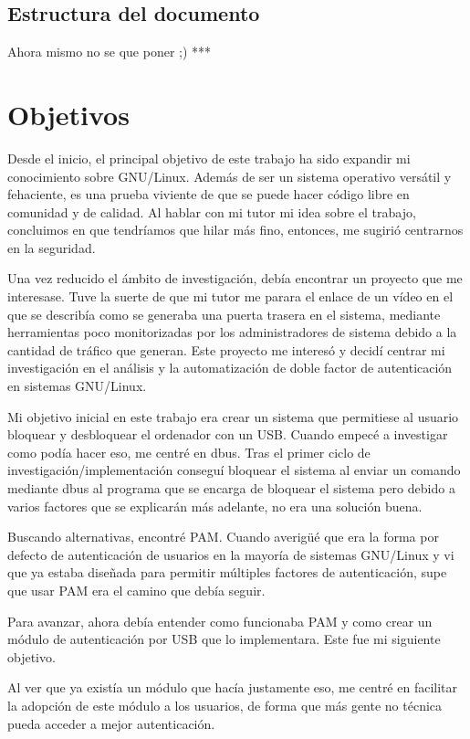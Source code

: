 \documentclass[titlepage, 12pt, a4paper]{article}
\begin{document}
\subsection{Estructura del documento}
Ahora mismo no se que poner ;) ***
\section{Objetivos}
Desde el inicio, el principal objetivo de este trabajo ha sido expandir mi conocimiento sobre \Gls{GNU/Linux}. Además de ser un sistema operativo versátil y fehaciente, es una prueba viviente de que se puede hacer código libre en comunidad y de calidad. Al hablar con mi tutor mi idea sobre el trabajo, concluimos en que tendríamos que hilar más fino, entonces, me sugirió centrarnos en la seguridad. \par
Una vez reducido el ámbito de investigación, debía encontrar un proyecto que me interesase. Tuve la suerte de que mi tutor me parara el enlace de un vídeo en el que se describía como se generaba una puerta trasera en el sistema, mediante herramientas poco monitorizadas por los administradores de sistema debido a la cantidad de tráfico que generan. Este proyecto me interesó y decidí centrar mi investigación en el análisis y la automatización de doble factor de autenticación en sistemas \Gls{GNU/Linux}. \par 
Mi objetivo inicial en este trabajo era crear un sistema que permitiese al usuario bloquear y desbloquear el ordenador con un \Gls{USB}. Cuando empecé a investigar como podía hacer eso, me centré en \Gls{dbus}. Tras el primer ciclo de investigación/implementación conseguí bloquear el sistema al enviar un comando mediante \Gls{dbus} al programa que se encarga de bloquear el sistema pero debido a varios factores que se explicarán más adelante, no era una solución buena. \par 
Buscando alternativas, encontré \Gls{PAM}. Cuando averigüé que era la forma por defecto de autenticación de usuarios en la mayoría de sistemas \Gls{GNU/Linux} y vi que ya estaba diseñada para permitir múltiples factores de autenticación, supe que usar PAM era el camino que debía seguir. \par
Para avanzar, ahora debía entender como funcionaba PAM y como crear un módulo de autenticación por \Gls{USB} que lo implementara. Este fue mi siguiente objetivo. \par
Al ver que ya existía un módulo que hacía justamente eso, me centré en facilitar la adopción de este módulo a los usuarios, de forma que más gente no técnica pueda acceder a mejor autenticación.
\end{document}
